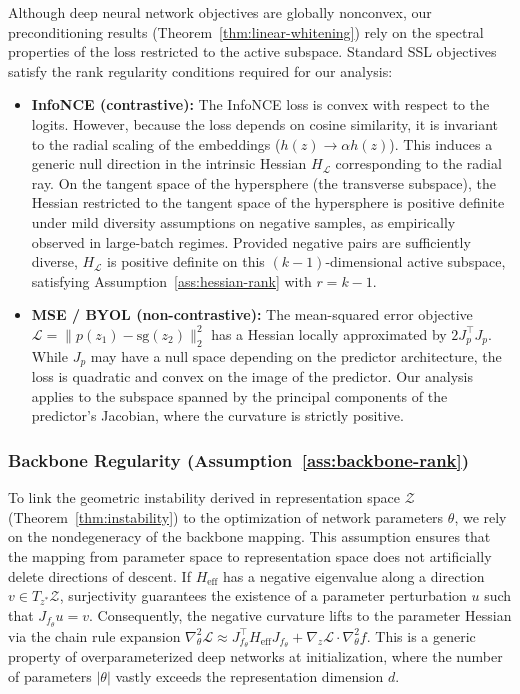 \documentclass{article}
\theoremstyle{plain}
\theoremstyle{definition}
\theoremstyle{remark}
\begin{document}
Although deep neural network objectives are globally nonconvex, our preconditioning results (Theorem~\ref{thm:linear-whitening}) rely on the spectral properties of the loss restricted to the active subspace. Standard SSL objectives satisfy the rank regularity conditions required for our analysis:
\begin{itemize}
    \item \textbf{InfoNCE (contrastive):}
    The InfoNCE loss is convex with respect to the logits. However, because the loss depends on cosine similarity, it is invariant to the radial scaling of the embeddings ($h(z) \to \alpha h(z)$). This induces a generic null direction in the intrinsic Hessian $H_{\mathcal{L}}$ corresponding to the radial ray. On the tangent space of the hypersphere (the transverse subspace), the Hessian restricted to the tangent space of the hypersphere is positive definite under mild diversity assumptions on negative samples, as empirically observed in large-batch regimes. Provided negative pairs are sufficiently diverse, $H_{\mathcal{L}}$ is positive definite on this $(k-1)$-dimensional active subspace, satisfying Assumption~\ref{ass:hessian-rank} with $r=k-1$.

    \item \textbf{MSE / BYOL (non-contrastive):}
    The mean-squared error objective $\mathcal{L} = \|p(z_1) - \mathrm{sg}(z_2)\|_2^2$ has a Hessian locally approximated by $2 J_p^\top J_p$. While $J_p$ may have a null space depending on the predictor architecture, the loss is quadratic and convex on the image of the predictor. Our analysis applies to the subspace spanned by the principal components of the predictor's Jacobian, where the curvature is strictly positive.
\end{itemize}

\subsubsection{Backbone Regularity (Assumption~\ref{ass:backbone-rank})}
\label{app:backbone-assumption}

To link the geometric instability derived in representation space $\mathcal{Z}$ (Theorem~\ref{thm:instability}) to the optimization of network parameters $\theta$, we rely on the nondegeneracy of the backbone mapping. This assumption ensures that the mapping from parameter space to representation space does not artificially delete directions of descent. If $H_{\text{eff}}$ has a negative eigenvalue along a direction $v \in T_{z^*} \mathcal{Z}$, surjectivity guarantees the existence of a parameter perturbation $u$ such that $J_{f_\theta} u = v$. Consequently, the negative curvature lifts to the parameter Hessian via the chain rule expansion $\nabla_\theta^2 \mathcal{L} \approx J_{f_\theta}^\top H_{\text{eff}} J_{f_\theta} + \nabla_z \mathcal{L} \cdot \nabla_\theta^2 f$. This is a generic property of overparameterized deep networks at initialization, where the number of parameters $|\theta|$ vastly exceeds the representation dimension $d$.
\end{document}
